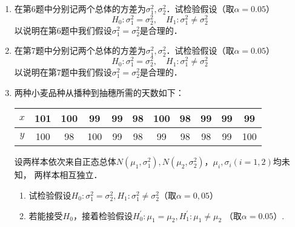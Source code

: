 \documentclass[10pt,a4paper]{article}
\begin{document}
\begin{enumerate}
    \item 在第6题中分别记两个总体的方差为$\sigma_1^2,\sigma_2^2$．试检验假设（取$\alpha=0.05$）
    $$H_0:\sigma_1^2=\sigma_2^2, \quad H_1:\sigma_1^2\neq \sigma^2_2$$
    以说明在第6题中我们假设$\sigma_1^2=\sigma_2^2$是合理的．





    \item 在第7题中分别记两个总体的方差为$\sigma_1^2,\sigma_2^2$．试检验假设（取$\alpha=0.05$）
    $$H_0:\sigma_1^2=\sigma_2^2, \quad H_1:\sigma_1^2\neq \sigma^2_2$$
    以说明在第7题中我们假设$\sigma_1^2=\sigma_2^2$是合理的．




    \item 两种小麦品种从播种到抽穗所需的天数如下：
    \renewcommand{\arraystretch}{1.3}   
    \begin{table}[H]\centering
        \begin{tabular}{c|cccccccccc}
        $x$ & 101 & 100 & 99  & 99 & 98 & 100 & 98 & 99 & 99 & 99  \\ \hline
        $y$ & 100 & 98  & 100 & 99 & 98 & 99  & 98 & 98 & 99 & 100
        \end{tabular}
    \end{table}
    \renewcommand{\arraystretch}{1.0}
    设两样本依次来自正态总体$N(\mu_1,\sigma_1^2),N(\mu_2,\sigma_2^2)$，$\mu_i,\sigma_i(i=1,2)$均未知，
    两样本相互独立．
    \begin{enumerate}
        \item 试检验假设$H_0:\sigma_1^2=\sigma_2^2,H_1:\sigma_1^2\neq \sigma_2^2$（取$\alpha=0,05$）
        \item 若能接受$H_0$，接着检验假设$H^\prime_0:\mu_1=\mu_2,H^\prime_1:\mu_1\neq \mu_2$ （取$\alpha=0.05$）.
    \end{enumerate}





\end{enumerate}
\end{document}
